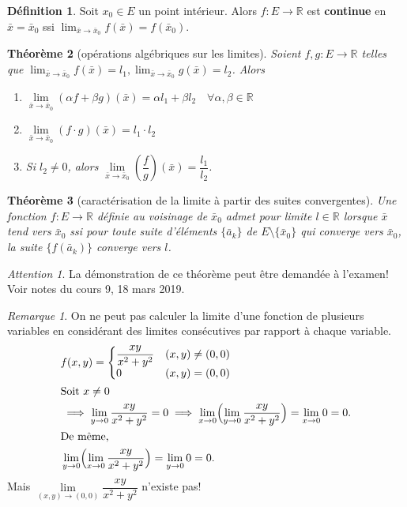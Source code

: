 \documentclass{report}
\theoremstyle{plain}
\newtheorem{thm}{Théorème}[chapter]
\theoremstyle{definition}
\newtheorem{defn}[thm]{Définition}
\theoremstyle{remark}
\newtheorem*{remark}{Remarque}
\newtheorem*{attention}{Attention}
\begin{document}
\begin{defn}
	Soit $x_0 \in E$ un point intérieur. Alors $f : E \to \mathbb R$ est \textbf{continue} en $\bar x = \bar x_0$ ssi $\lim_{\bar x \to \bar x_0} f(\bar x) = f(\bar x_0)$.
\end{defn}

\begin{thm}[opérations algébriques sur les limites]
	Soient $f, g : E \to \mathbb R$ telles que $\lim_{\bar x \to \bar x_0} f(\bar x) = l_1, \lim_{\bar x \to \bar x_0} g(\bar x) = l_2$. Alors
	\begin{enumerate}
		\item $\lim\limits_{\bar x \to \bar x_0} (\alpha f + \beta g)(\bar x) = \alpha l_1 + \beta l_2 \quad \forall \alpha, \beta \in \mathbb R$
		\item $\lim\limits_{\bar x \to \bar x_0} (f \cdot g)(\bar x) = l_1 \cdot l_2$
		\item Si $l_2 \neq 0$, alors $\lim\limits_{\bar x \to \bar x_0} \left(\dfrac{f}{g}\right)(\bar x) = \dfrac{l_1}{l_2}$.
	\end{enumerate}
\end{thm}

\begin{thm}[caractérisation de la limite à partir des suites convergentes]
	Une fonction $f : E \to \mathbb R$ définie au voisinage de $\bar x_0$ admet pour limite $l \in \mathbb R$ lorsque $\bar x$ tend vers $\bar x_0$ ssi pour \emph{toute} suite d'éléments $\{\bar a_k\}$ de $E \setminus \{\bar x_0\}$ qui converge vers $\bar x_0$, la suite $\{f(\bar a_k)\}$ converge vers $l$.
\end{thm}
\begin{attention} La démonstration de ce théorème peut être demandée à l'examen! Voir notes du cours 9, 18 mars 2019. \end{attention}

\begin{remark} On ne peut pas calculer la limite d'une fonction de plusieurs variables en considérant des limites consécutives par rapport à chaque variable.
\begin{align*}
	&f(x, y) = \begin{cases}\begin{aligned}
		&\frac{xy}{x^2 + y^2} & &(x, y) \neq (0, 0) \\
		&0 & &(x, y) = (0, 0)
		\end{aligned}\end{cases} \\
\intertext{Soit $x \neq 0$}
	&\implies \lim_{y \to 0} \frac{xy}{x^2 + y^2} = 0 \implies \lim_{x \to 0} \Bigl( \lim_{y \to 0} \frac{xy}{x^2 + y^2} \Bigr) = \lim_{x \to 0} 0 = 0. \\
\intertext{De même,}
	&\lim_{y \to 0} \Bigl( \lim_{x \to 0} \frac{xy}{x^2 + y^2} \Bigr) = \lim_{y \to 0} 0 = 0.
\end{align*}
	Mais $\lim\limits_{(x, y) \to (0, 0)} \dfrac{xy}{x^2 + y^2}$ n'existe pas!
\end{remark}
\end{document}
